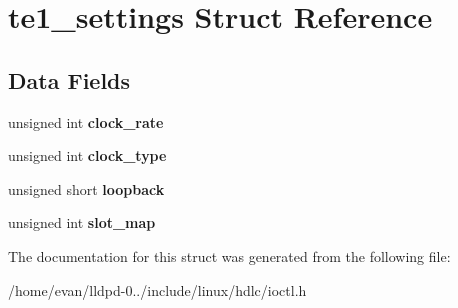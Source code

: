 \section{te1\-\_\-settings \-Struct \-Reference}
\label{structte1__settings}
\subsection*{\-Data \-Fields}
\begin{DoxyCompactItemize}
\item 
unsigned int {\bfseries clock\-\_\-rate}\label{structte1__settings_a133e878278d4fa925a658019fd555e50}

\item 
unsigned int {\bfseries clock\-\_\-type}\label{structte1__settings_a136005d437419001b68c66d2f9bb3e16}

\item 
unsigned short {\bfseries loopback}\label{structte1__settings_ae0eece6539174750cf895270e4cfdc72}

\item 
unsigned int {\bfseries slot\-\_\-map}\label{structte1__settings_af1f80327e2a8c475a9391aa2030b7518}

\end{DoxyCompactItemize}


\-The documentation for this struct was generated from the following file\-:\begin{DoxyCompactItemize}
\item 
/home/evan/lldpd-\/0../include/linux/hdlc/ioctl.\-h\end{DoxyCompactItemize}
